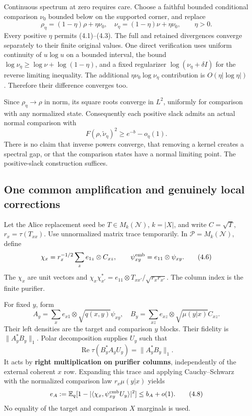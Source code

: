 \documentclass[11pt,reqno]{amsart}
\numberwithin{equation}{section}
\begin{document}
Continuous spectrum at zero requires care. Choose a faithful bounded conditional comparison \(\nu_0\) bounded below on the supported corner, and replace \[
 \rho_\eta=(1-\eta)\rho+\eta\nu_0,\quad
 \nu_\eta=(1-\eta)\nu+\eta\nu_0,\qquad\eta>0. \tag{4.4}
\] Every positive \(\eta\) permits (4.1)--(4.3). The full and retained divergences converge separately to their finite original values. One direct verification uses uniform continuity of \(u\log u\) on a bounded interval, the bound \(\log\nu_\eta\ge\log\nu+\log(1-\eta)\), and a fixed regularizer \(\log(\nu_\eta+\delta I)\) for the reverse limiting inequality. The additional \(\eta\nu_0\log\nu_\eta\) contribution is \(O(\eta|\log\eta|)\). Therefore their difference converges too.

Since \(\rho_\eta\to\rho\) in norm, its square roots converge in \(L^2\), uniformly for comparison with any normalized state. Consequently each positive slack admits an actual normal comparison with \[
 F(\rho,\widetilde\nu_\eta)^2\ge e^{-b}-o_\eta(1). \tag{4.5}
\] There is no claim that inverse powers converge, that removing a kernel creates a spectral gap, or that the comparison states have a normal limiting point. The positive-slack construction suffices.

\subsection{One common amplification and genuinely local corrections}\label{one-common-amplification-and-genuinely-local-corrections}

Let the Alice replacement seed be \(T\in M_k(\mathcal N)\), \(k=|X|\), and write \(C=\sqrt T\), \(r_x=\tau(T_{xx})\). Use unnormalized matrix trace temporarily. In \(\mathcal P=M_k(\mathcal N)\), define \[
 \chi_x=r_x^{-1/2}\sum_z e_{1z}\otimes C_{xz},\qquad
 \psi_{xy}^{\rm emb}=e_{11}\otimes\psi_{xy}. \tag{4.6}
\] The \(\chi_x\) are unit vectors and \(\chi_x\chi_{x'}^*=e_{11}\otimes T_{xx'}/\sqrt{r_xr_{x'}}\). The column index is the finite purifier.

For fixed \(y\), form \[
 A_y=\sum_x e_{x1}\otimes\sqrt{q(x,y)}\psi_{xy},\quad
 B_y=\sum_{xz}e_{xz}\otimes\sqrt{\mu(y|x)}C_{xz}. \tag{4.7}
\] Their left densities are the target and comparison \(y\) blocks. Their fidelity is \(\|A_y^*B_y\|_1\). Polar decomposition supplies \(U_y\) such that \[
 \operatorname{Re}\tau(B_y^*A_yU_y)=\|A_y^*B_y\|_1.
\] It acts by \textbf{right multiplication on purifier columns}, independently of the external coherent \(x\) row. Expanding this trace and applying Cauchy--Schwarz with the normalized comparison law \(r_x\mu(y|x)\) yields \[
 e_A:=\mathbb E_q[1-|\langle\chi_x,\psi_{xy}^{\rm emb}U_y\rangle|^2]
 \le b_A+o(1). \tag{4.8}
\] No equality of the target and comparison \(X\) marginals is used.
\end{document}
